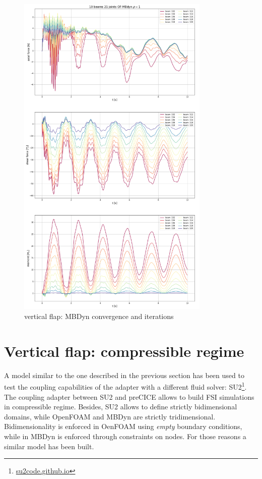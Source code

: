\begin{figure}[htbp!]
	\centering
	\includegraphics[width=0.82\textwidth]{images/vert_flap/OF-MBDyn_rho1_act.png}
	\caption{vertical flap: MBDyn convergence and iterations}
	\label{fig:vf_mbd_internal}
\end{figure}


\newpage

\section{Vertical flap: compressible regime}
\label{sec:su2-mbd}

A model similar to the one described in the previous section has been used to test the coupling capabilities of the adapter with a different fluid solver: SU2\footnote{\href{https://su2code.github.io/}{su2code.github.io}}. The coupling adapter between SU2 and preCICE allows to build FSI simulations in compressible regime. Besides, SU2 allows to define strictly bidimensional domains, while OpenFOAM and MBDyn are strictly tridimensional. Bidimensionality is enforced in OenFOAM using \textit{empty} boundary conditions, while in MBDyn is enforced through constraints on nodes.
For those reasons a similar model has been built. 


